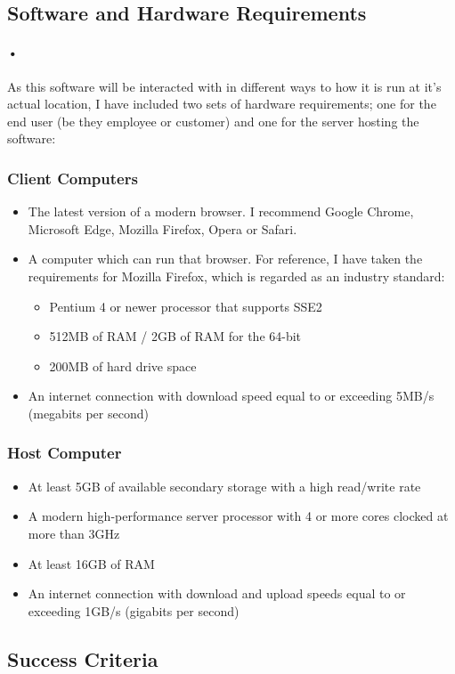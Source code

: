 \documentclass{article}
\begin{document}
    \subsection{Software and Hardware Requirements}
    \paragraph{•}
    As this software will be interacted with in different ways to how it is run at it’s actual location, I have included two sets of hardware requirements; one for the end user (be they employee or customer) and one for the server hosting the software:
    
    \subsubsection{Client Computers}
    \begin{itemize}
    \item The latest version of a modern browser. 
    I recommend Google Chrome, Microsoft Edge, Mozilla Firefox, Opera or Safari.
    \item A computer which can run that browser. For reference, I have taken the requirements for Mozilla Firefox, which is regarded as an industry standard:
    \begin{itemize}
    \item Pentium 4 or newer processor that supports SSE2
    \item 512MB of RAM / 2GB of RAM for the 64-bit 
    \item 200MB of hard drive space
    \end{itemize}
    \item An internet connection with download speed equal to or exceeding 5MB/s (megabits per second)
    \end{itemize}
    
    \subsubsection{Host Computer}
    \begin{itemize}
    \item At least 5GB of available secondary storage with a high read/write rate
    \item A modern high-performance server processor with 4 or more cores clocked at more than 3GHz
    \item At least 16GB of RAM
    \item An internet connection with download and upload speeds equal to or exceeding 1GB/s (gigabits per second)
    \end{itemize}
    
    \subsection{Success Criteria}
\end{document}
